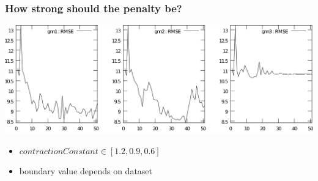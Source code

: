 \documentclass{beamer}
\begin{document}
\begin{frame}
\frametitle{How strong should the penalty be?}
\begin{center}
	\includegraphics[scale=0.065]{img/rmse1_clipped}
\end{center}
\begin{itemize}
	\item $contractionConstant \in [1.2, 0.9, 0.6]$
	\item boundary value depends on dataset
\end{itemize}
\end{frame}
\end{document}
